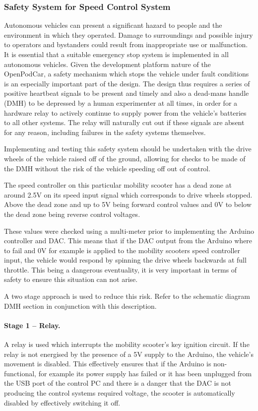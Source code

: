 \documentclass[a4paper]{article}
\begin{document}
\subsubsection{Safety System for Speed Control System}

Autonomous vehicles can present a significant hazard to people and the environment in which they operated. Damage to surroundings and possible injury to operators and bystanders could result from inappropriate use or malfunction. It is essential that a suitable emergency stop system is implemented in all autonomous vehicles.   Given the development platform nature of the OpenPodCar, a safety mechanism which stops the vehicle under fault conditions is an especially important part of the design.   The design thus requires a series of positive heartbeat signals to be present and timely and also a dead-mans handle (DMH) to be depressed by a human experimenter at all times, in order for a hardware relay to actively continue to supply power from the vehicle’s batteries to all other systems.  The relay will naturally cut out if these signals are absent for any reason, including failures in the safety systems themselves.

Implementing and testing this safety system should be undertaken with the drive wheels of the vehicle raised off of the ground, allowing for checks to be made of the DMH without the risk of the vehicle speeding off out of control.

The speed controller on this particular mobility scooter has a dead zone at around 2.5V on its speed input signal which corresponds to drive wheels stopped. Above the dead zone and up to 5V being forward control values and 0V to below the dead zone being reverse control voltages.

These values were checked using a multi-meter prior to implementing the Arduino controller and DAC.  This means that if the DAC output from the Arduino where to fail and 0V for example is applied to the mobility scooters speed controller input, the vehicle would respond by spinning the drive wheels backwards at full throttle. This being a dangerous eventuality, it is very important in terms of safety to ensure this situation can not arise.

A two stage approach is used to reduce this risk. Refer to the schematic diagram DMH section in conjunction with this description.

\paragraph{Stage 1 – Relay.} A relay is used which interrupts the mobility scooter’s key ignition circuit. If the relay is not energised by the presence of a 5V supply to the Arduino, the vehicle’s movement is disabled. This effectively ensures that if the Arduino is non-functional, for example its power supply has failed or it has been unplugged from the USB port of the control PC and there is a danger that the DAC is not producing the control systems required voltage, the scooter is automatically disabled by effectively switching it off.
\end{document}
